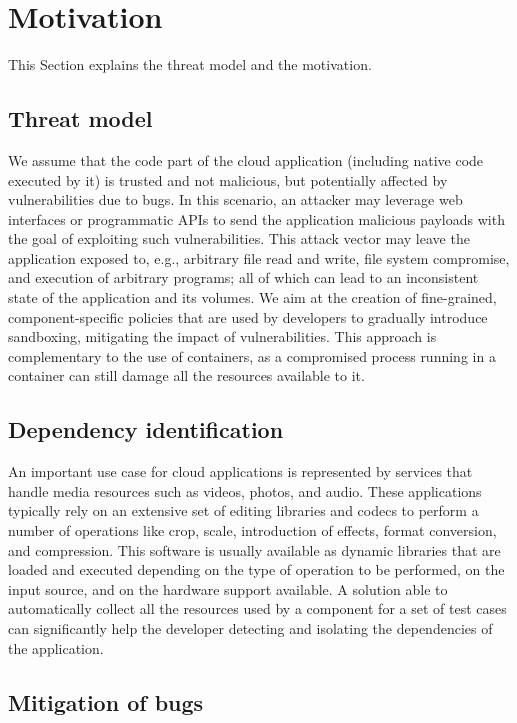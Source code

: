 \section{Motivation}\label{sect:motivation}

This Section explains the threat model and the motivation.

\subsection{Threat model}\label{subsect:threat-model}

We assume that the code part of the cloud application (including
native code executed by it) is trusted and not malicious, but
potentially affected by vulnerabilities due to bugs.  In this
scenario, an attacker may leverage web interfaces or programmatic APIs
to send the application malicious payloads with the goal of exploiting
such vulnerabilities. This attack vector may leave the application
exposed to, e.g., arbitrary file read and write, file system
compromise, and execution of arbitrary programs; all of which can lead
to an inconsistent state of the application and its volumes. We aim at
the creation of fine-grained, component-specific policies that are
used by developers to gradually introduce sandboxing, mitigating the
impact of vulnerabilities. This approach is complementary to the use
of containers, as a compromised process running in a container can
still damage all the resources available to it.

\subsection{Dependency identification}

An important use case for cloud applications is represented by
services that handle media resources such as videos, photos, and
audio. These applications typically rely on an extensive set of
editing libraries and codecs to perform a number of operations like
crop, scale, introduction of effects, format conversion, and
compression. This software is usually available as dynamic libraries
that are loaded and executed depending on the type of operation to be
performed, on the input source, and on the hardware support
available. A solution able to automatically collect all the resources
used by a component for a set of test cases can significantly help the
developer detecting and isolating the dependencies of the application.

\subsection{Mitigation of bugs}

